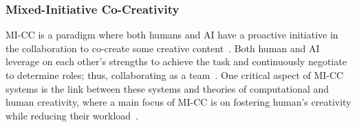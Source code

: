 






\subsubsection{Mixed-Initiative Co-Creativity}


MI-CC is a paradigm where both humans and AI have a proactive initiative in the collaboration to co-create some creative content~\cite{p8yannakakis2014micc,liapis2016mixed}. Both human and AI leverage on each other's strengths to achieve the task and continuously negotiate to determine roles; thus, collaborating as a team~\cite{p8Allen99-MIinteraction}. One critical aspect of MI-CC systems is the link between these systems and theories of computational and human creativity, where a main focus of MI-CC is on fostering human's creativity while reducing their workload~\cite{p8Liapis2016-CanComputersFosterCreativity,Alvarez2018}.

